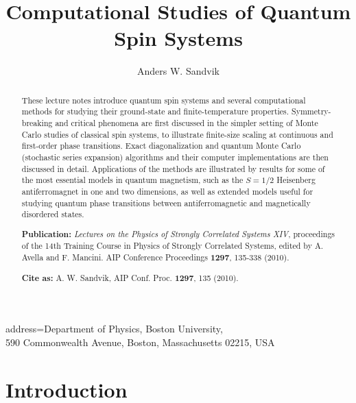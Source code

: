 \documentclass[draft,numberedheadings]{aipproc}
\begin{document}
\title{Computational Studies \break of Quantum Spin Systems}



\author{Anders W. Sandvik}
{address={Department of Physics, Boston University, \\
590 Commonwealth Avenue, Boston, Massachusetts 02215, USA}}

\begin{abstract}
These lecture notes introduce quantum spin systems and several computational methods for studying their ground-state and finite-temperature 
properties. Symmetry-breaking and critical phenomena are first discussed in the simpler setting of Monte Carlo studies of classical spin systems, 
to illustrate finite-size scaling at continuous and first-order phase transitions. Exact diagonalization and quantum Monte Carlo (stochastic
series expansion) algorithms and their computer implementations are then discussed in detail. Applications of the methods are illustrated by 
results for some of the most essential models in quantum magnetism, such as the $S=1/2$ Heisenberg antiferromagnet in one and two dimensions, 
as well as extended models useful for studying quantum phase transitions between antiferromagnetic and magnetically disordered states.
\vskip5mm

\noindent
{\bf Publication:} {\it Lectures on the Physics of Strongly Correlated 
Systems XIV}, proceedings of the 14th Training Course in Physics of 
Strongly Correlated Systems, edited by A. Avella and F. Mancini.
AIP Conference Proceedings {\bf 1297}, 135-338 (2010).
\vskip2mm

\noindent
{\bf Cite as:}  A. W. Sandvik, AIP Conf. Proc. {\bf 1297},  135 (2010).
\vskip2mm

\end{abstract}

\maketitle
\newpage

\tableofcontents

\newpage

\section{Introduction}
\label{sec_intro}
\end{document}
